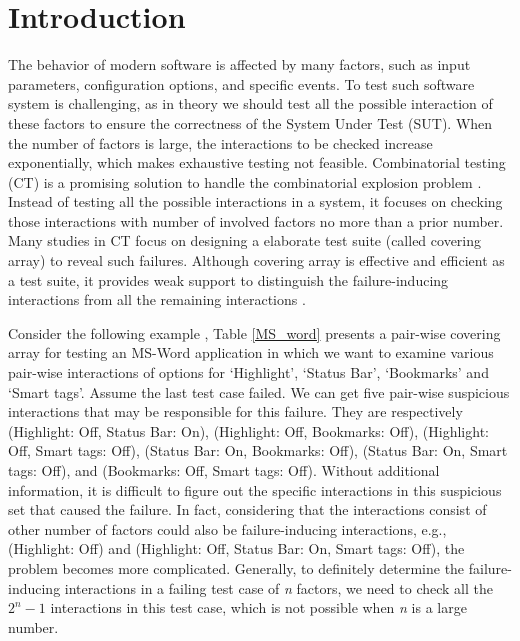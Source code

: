 \section{Introduction}\label{sec:intro}

The behavior of modern software is affected by many factors, such as input parameters, configuration options, and specific events. To test such software system is challenging, as in theory we should test all the possible interaction of these factors to ensure the correctness of the System Under Test (SUT)\cite{song2012itree}. When the number of factors is large, the interactions to be checked increase exponentially, which makes exhaustive testing not feasible. Combinatorial testing (CT) is a promising solution to handle the combinatorial explosion problem \cite{kuhn2002investigation,kuhn2004software}. Instead of testing all the possible interactions in a system, it focuses on checking those interactions with number of involved factors no more than a prior number. Many studies in CT focus on designing a elaborate test suite (called covering array) to reveal such failures. Although covering array is effective and efficient as a test suite, it provides weak support to distinguish the failure-inducing interactions from all the remaining interactions \cite{colbourn2008locating,martinez2008algorithms}.


Consider the following example \cite{bach2004pairwise}, Table \ref{MS_word} presents a pair-wise covering array for testing an MS-Word application in which we want to examine various pair-wise interactions of options for `Highlight', `Status Bar', `Bookmarks' and `Smart tags'. Assume the last test case failed. We can get five pair-wise suspicious interactions that may be responsible for this failure. They are respectively (Highlight: Off, Status Bar: On), (Highlight: Off, Bookmarks: Off), (Highlight: Off, Smart tags: Off), (Status Bar: On, Bookmarks: Off), (Status Bar: On, Smart tags: Off),  and (Bookmarks: Off, Smart tags: Off). Without additional information, it is difficult to figure out the specific interactions in this suspicious set that caused the failure. In fact, considering that the interactions consist of other number of factors could also be failure-inducing interactions, e.g., (Highlight: Off) and (Highlight: Off, Status Bar: On, Smart tags: Off), the problem becomes more complicated. Generally, to definitely determine the failure-inducing interactions in a failing test case of \emph{n} factors, we need to check all the $2^n - 1$ interactions in this test case, which is not possible when \emph{n} is a large number.

